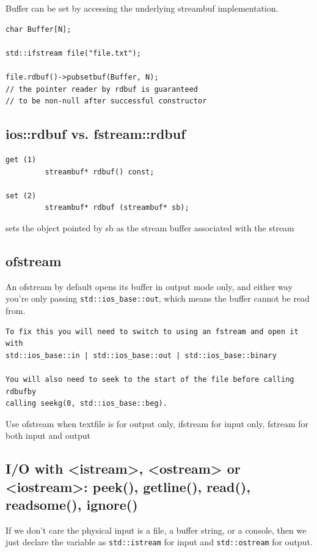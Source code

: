 Buffer can be set by accessing the underlying streambuf implementation.

\begin{verbatim}
char Buffer[N];

std::ifstream file("file.txt");

file.rdbuf()->pubsetbuf(Buffer, N);
// the pointer reader by rdbuf is guaranteed
// to be non-null after successful constructor
\end{verbatim}


\subsection{ios::rdbuf vs. fstream::rdbuf}

\begin{verbatim}
get (1)	
         streambuf* rdbuf() const;

set (2)	
         streambuf* rdbuf (streambuf* sb);
\end{verbatim}
sets the object pointed by sb as the stream buffer associated with the stream


\subsection{ofstream}

An ofstream by default opens its buffer in output mode only, and either way
you're only passing \verb!std::ios_base::out!, which means the buffer cannot be
read from.

\begin{verbatim}
To fix this you will need to switch to using an fstream and open it with
std::ios_base::in | std::ios_base::out | std::ios_base::binary

You will also need to seek to the start of the file before calling rdbufby
calling seekg(0, std::ios_base::beg).
\end{verbatim}

Use ofstream when textfile is for output only, ifstream for input only, fstream
for both input and output


\subsection{I/O with <istream>, <ostream> or <iostream>: peek(), getline(),
read(), readsome(), ignore()}
\label{sec:iostream}


If we don't care the physical input is a file, a buffer string, or a
console, then we just declare the variable as \verb!std::istream! for input and
\verb!std::ostream! for output. 

